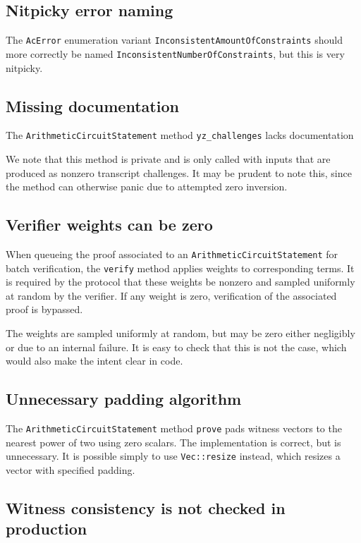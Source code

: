 \documentclass{article}
\begin{document}
\subsection{Nitpicky error naming}

The \texttt{AcError} enumeration variant \texttt{InconsistentAmountOfConstraints} should more correctly be named \texttt{InconsistentNumberOfConstraints}, but this is very nitpicky.


\subsection{Missing documentation}

The \texttt{ArithmeticCircuitStatement} method \texttt{yz\_challenges} lacks documentation

We note that this method is private and is only called with inputs that are produced as nonzero transcript challenges.
It may be prudent to note this, since the method can otherwise panic due to attempted zero inversion.


\subsection{Verifier weights can be zero}

When queueing the proof associated to an \texttt{ArithmeticCircuitStatement} for batch verification, the \texttt{verify} method applies weights to corresponding terms.
It is required by the protocol that these weights be nonzero and sampled uniformly at random by the verifier.
If any weight is zero, verification of the associated proof is bypassed.

The weights are sampled uniformly at random, but may be zero either negligibly or due to an internal failure.
It is easy to check that this is not the case, which would also make the intent clear in code.


\subsection{Unnecessary padding algorithm}

The \texttt{ArithmeticCircuitStatement} method \texttt{prove} pads witness vectors to the nearest power of two using zero scalars.
The implementation is correct, but is unnecessary.
It is possible simply to use \texttt{Vec::resize} instead, which resizes a vector with specified padding.


\subsection{Witness consistency is not checked in production}
\end{document}
